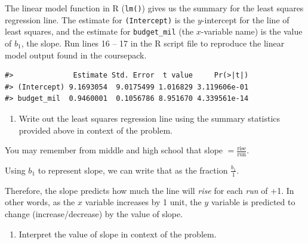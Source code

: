 \documentclass[
]{report}
\newenvironment{Shaded}{\begin{snugshade}}{\end{snugshade}}
\newcommand{\AttributeTok}[1]{\textcolor[rgb]{0.77,0.63,0.00}{#1}}
\newcommand{\CommentTok}[1]{\textcolor[rgb]{0.56,0.35,0.01}{\textit{#1}}}
\newcommand{\FunctionTok}[1]{\textcolor[rgb]{0.00,0.00,0.00}{#1}}
\newcommand{\NormalTok}[1]{#1}
\newcommand{\OtherTok}[1]{\textcolor[rgb]{0.56,0.35,0.01}{#1}}
\newcommand{\SpecialCharTok}[1]{\textcolor[rgb]{0.00,0.00,0.00}{#1}}
\providecommand{\tightlist}{%
  \setlength{\itemsep}{0pt}\setlength{\parskip}{0pt}}
\begin{document}
The linear model function in R (\texttt{lm()}) gives us the summary for the least squares regression line. The estimate for \texttt{(Intercept)} is the \(y\)-intercept for the line of least squares, and the estimate for \texttt{budget\_mil} (the \(x\)-variable name) is the value of \(b_1\), the slope. Run lines 16 -- 17 in the R script file to reproduce the linear model output found in the coursepack.

\begin{Shaded}
\end{Shaded}

\begin{verbatim}
#>              Estimate Std. Error  t value     Pr(>|t|)
#> (Intercept) 9.1693054  9.0175499 1.016829 3.119606e-01
#> budget_mil  0.9460001  0.1056786 8.951670 4.339561e-14
\end{verbatim}

\begin{enumerate}
\def\labelenumi{\arabic{enumi}.}
\setcounter{enumi}{3}
\tightlist
\item
  Write out the least squares regression line using the summary statistics provided above in context of the problem.
  \vspace{0.8in}
\end{enumerate}

You may remember from middle and high school that slope \(=\frac{\mbox{rise}}{\mbox{run}}\).

Using \(b_1\) to represent slope, we can write that as the fraction \(\frac{b_1}{1}\).

Therefore, the slope predicts how much the line will \emph{rise} for each \emph{run} of +1. In other words, as the \(x\) variable increases by 1 unit, the \(y\) variable is predicted to change (increase/decrease) by the value of slope.

\begin{enumerate}
\def\labelenumi{\arabic{enumi}.}
\setcounter{enumi}{4}
\tightlist
\item
  Interpret the value of slope in context of the problem.
\end{enumerate}
\end{document}
